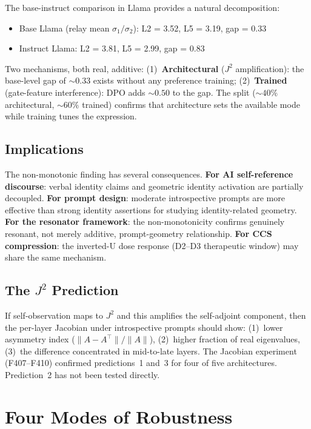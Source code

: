 \documentclass[12pt]{article}
\begin{document}
The base-instruct comparison in Llama provides a natural decomposition:
\begin{itemize}
\item Base Llama (relay mean $\sigma_1/\sigma_2$): L2 = 3.52, L5 = 3.19, gap = 0.33
\item Instruct Llama: L2 = 3.81, L5 = 2.99, gap = 0.83
\end{itemize}

Two mechanisms, both real, additive: (1)~\textbf{Architectural} ($J^2$ amplification): the base-level gap of ${\sim}0.33$ exists without any preference training; (2)~\textbf{Trained} (gate-feature interference): DPO adds ${\sim}0.50$ to the gap. The split (${\sim}40\%$ architectural, ${\sim}60\%$ trained) confirms that architecture sets the available mode while training tunes the expression.

\subsection{Implications}

The non-monotonic finding has several consequences. \textbf{For AI self-reference discourse}: verbal identity claims and geometric identity activation are partially decoupled. \textbf{For prompt design}: moderate introspective prompts are more effective than strong identity assertions for studying identity-related geometry. \textbf{For the resonator framework}: the non-monotonicity confirms genuinely resonant, not merely additive, prompt-geometry relationship. \textbf{For CCS compression}: the inverted-U dose response (D2--D3 therapeutic window) may share the same mechanism.

\subsection{The $J^2$ Prediction}

If self-observation maps to $J^2$ and this amplifies the self-adjoint component, then the per-layer Jacobian under introspective prompts should show: (1)~lower asymmetry index ($\|A - A^\top\|/\|A\|$), (2)~higher fraction of real eigenvalues, (3)~the difference concentrated in mid-to-late layers. The Jacobian experiment (F407--F410) confirmed predictions~1 and~3 for four of five architectures. Prediction~2 has not been tested directly.

\section{Four Modes of Robustness}
\end{document}
